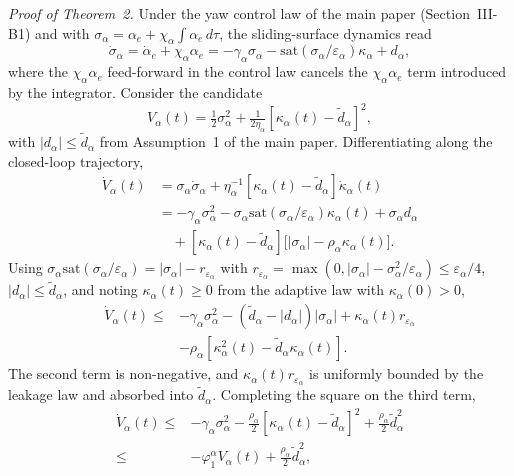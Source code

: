 \documentclass[10pt,journal]{IEEEtran}
\begin{document}
\textit{Proof of Theorem~2.} Under the yaw control law of the main paper (Section~III-B1) and with $\sigma_\alpha=\alpha_e+\chi_\alpha\!\int\alpha_e\,d\tau$, the sliding-surface dynamics read
\begin{equation*}
\dot{\sigma}_\alpha = \dot{\alpha}_e + \chi_\alpha\alpha_e = -\gamma_\alpha\sigma_\alpha - \text{sat}(\sigma_\alpha/\varepsilon_\alpha)\kappa_\alpha + d_\alpha,
\end{equation*}
where the $\chi_\alpha\alpha_e$ feed-forward in the control law cancels the $\chi_\alpha\alpha_e$ term introduced by the integrator. Consider the candidate
\begin{equation} \label{sup:yaw lyapunov}
    V_\alpha(t) = \tfrac12\sigma_\alpha^2 + \tfrac{1}{2\eta_\alpha}[\kappa_\alpha(t)-\tilde{d}_\alpha]^2,
\end{equation}
with $|d_\alpha|\le\tilde{d}_\alpha$ from Assumption~1 of the main paper. Differentiating along the closed-loop trajectory,
\begin{align*}
\dot{V}_\alpha(t) &= \sigma_\alpha\dot{\sigma}_\alpha + \eta_\alpha^{-1}[\kappa_\alpha(t)-\tilde{d}_\alpha]\dot{\kappa}_\alpha(t)\\
&= -\gamma_\alpha\sigma_\alpha^2 - \sigma_\alpha\text{sat}(\sigma_\alpha/\varepsilon_\alpha)\kappa_\alpha(t) + \sigma_\alpha d_\alpha\\
&\quad + [\kappa_\alpha(t)-\tilde{d}_\alpha]\big[|\sigma_\alpha| - \rho_\alpha\kappa_\alpha(t)\big].
\end{align*}
Using $\sigma_\alpha\text{sat}(\sigma_\alpha/\varepsilon_\alpha) = |\sigma_\alpha| - r_{\varepsilon_\alpha}$ with $r_{\varepsilon_\alpha}=\max(0,|\sigma_\alpha|-\sigma_\alpha^2/\varepsilon_\alpha)\le\varepsilon_\alpha/4$, $|d_\alpha|\le\tilde{d}_\alpha$, and noting $\kappa_\alpha(t)\ge 0$ from the adaptive law with $\kappa_\alpha(0)>0$,
\begin{align*}
\dot{V}_\alpha(t) \le& -\gamma_\alpha\sigma_\alpha^2 - (\tilde{d}_\alpha-|d_\alpha|)|\sigma_\alpha| + \kappa_\alpha(t) r_{\varepsilon_\alpha}\\
&- \rho_\alpha[\kappa_\alpha^2(t) - \tilde{d}_\alpha\kappa_\alpha(t)].
\end{align*}
The second term is non-negative, and $\kappa_\alpha(t) r_{\varepsilon_\alpha}$ is uniformly bounded by the leakage law and absorbed into $\tilde{d}_\alpha$. Completing the square on the third term,
\begin{align*}
\dot{V}_\alpha(t) \le& -\gamma_\alpha\sigma_\alpha^2 - \tfrac{\rho_\alpha}{2}[\kappa_\alpha(t)-\tilde{d}_\alpha]^2 + \tfrac{\rho_\alpha}{2}\tilde{d}_\alpha^2\\
\le& -\varphi_1^\alpha V_\alpha(t) + \tfrac{\rho_\alpha}{2}\tilde{d}_\alpha^2,
\end{align*}
\end{document}
